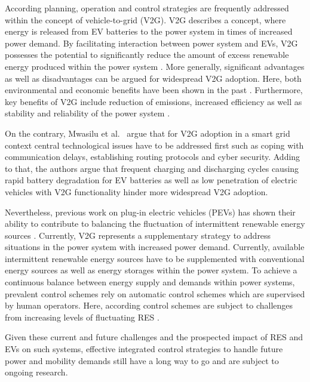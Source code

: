 \documentclass[conference]{IEEEtran}
\begin{document}
	According planning, operation and control strategies are frequently addressed within the concept of vehicle-to-grid (V2G). V2G describes a concept, where energy is released from EV batteries to the power system in times of increased power demand.  By facilitating interaction between power system and EVs, V2G possesses the potential to significantly reduce the amount of excess renewable energy produced within the power system \cite{richardson2013electric}. More generally, significant advantages as well as disadvantages can be argued for widespread V2G adoption. Here, both environmental and economic benefits have been shown in the past \cite{faria2012sustainability, richardson2013electric, mwasilu2014electric}. Furthermore, key benefits of V2G include reduction of emissions, increased efficiency as well as stability and reliability of the power system \cite{yilmaz2013review}.
	
	On the contrary, Mwasilu et al.~\cite{mwasilu2014electric} argue that for V2G adoption in a smart grid context central technological issues have to be addressed first such as coping with communication delays, establishing routing protocols and cyber security. Adding to that, the authors argue that frequent charging and discharging cycles causing rapid battery degradation for EV batteries as well as low penetration of electric vehicles with V2G functionality hinder more widespread V2G adoption.
	
	Nevertheless, previous work on plug-in electric vehicles (PEVs) has shown their ability to contribute to balancing the fluctuation of intermittent renewable energy sources \cite{dallinger2012grid}. Currently, V2G represents a supplementary strategy to address situations in the power system with increased power demand. Currently, available intermittent renewable energy sources have to be supplemented with conventional energy sources as well as energy storages within the power system. To achieve a continuous balance between energy supply and demands within power systems, prevalent control schemes rely on automatic control schemes which are supervised by human operators. Here, according control schemes are subject to challenges from increasing levels of fluctuating RES \cite{heussen2012unified}.
	
	Given these current and future challenges and the prospected impact of RES and EVs on such systems, effective integrated control strategies to handle future power and mobility demands still have a long way to go and are subject to ongoing research.
	
\end{document}
